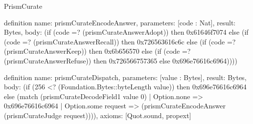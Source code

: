 \begin{lexlean}{PrismCurate}
\begin{semanticmodule}
definition{
  name: prismCurateEncodeAnswer,
  parameters: [code : Nat],
  result: Bytes,
  body: (if (code =? (prismCurateAnswerAdopt)) then 0x61646f7074 else (if (code =? (prismCurateAnswerRecall)) then 0x726563616c6c else (if (code =? (prismCurateAnswerKeep)) then 0x6b656570 else (if (code =? (prismCurateAnswerRefuse)) then 0x726566757365 else 0x696e76616c6964))))
}

definition{
  name: prismCurateDispatch,
  parameters: [value : Bytes],
  result: Bytes,
  body: (if (256 <? (Foundation.Bytes::byteLength value)) then 0x696e76616c6964 else (match (prismCurateDecodeField1 value 0)
    | Option.none => 0x696e76616c6964
    | Option.some request => (prismCurateEncodeAnswer (prismCurateJudge request)))),
  axioms: [Quot.sound, propext]
}
\end{semanticmodule}
\end{lexlean}
